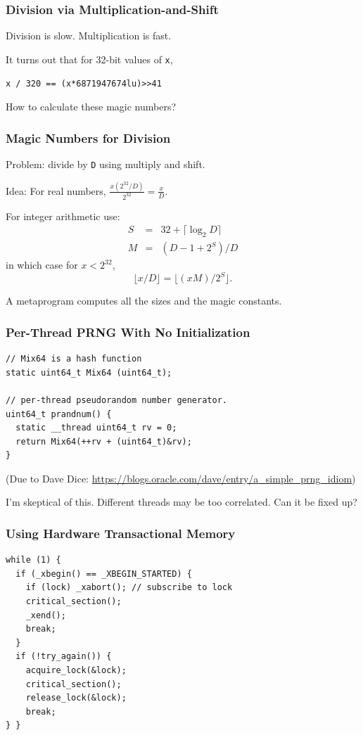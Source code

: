 \documentclass[xcolor=dvipsnames,14pt]{beamer}
\begin{document}
\begin{frame}
\frametitle{Division via Multiplication-and-Shift}

Division is slow.  Multiplication is fast.

It turns out that for 32-bit values of \texttt{x},
\begin{center}
\texttt{x / 320 == (x*6871947674lu)>>41}
\end{center}

How to calculate these magic numbers? 
\end{frame}

\begin{frame}
\frametitle{Magic Numbers for Division}

Problem: divide by \texttt{D} using multiply and shift.

Idea:  For real numbers, $\frac{x (2^{32}/D)}{2^{32}} = \frac{x}{D}$.

For integer arithmetic use:
\begin{eqnarray*}
S & = & 32+\lceil \log_2 D \rceil \\
M & = & (D-1+2^S)/D 
\end{eqnarray*}
in which case for $x<2^{32}$,
\[
\lfloor x/D \rfloor = \lfloor (xM)/2^S \rfloor.
\]

A metaprogram computes all the sizes and the magic constants.
\end{frame}

\begin{frame}[fragile]
\frametitle{Per-Thread PRNG With No Initialization}

\begin{verbatim}
// Mix64 is a hash function
static uint64_t Mix64 (uint64_t);

// per-thread pseudorandom number generator.
uint64_t prandnum() {
  static __thread uint64_t rv = 0;
  return Mix64(++rv + (uint64_t)&rv);
}
\end{verbatim}

(Due to Dave Dice:
\url{https://blogs.oracle.com/dave/entry/a_simple_prng_idiom})

I'm skeptical of this.  Different threads may be too correlated.  Can
it be fixed up?

\end{frame}

\begin{frame}[fragile]
\frametitle{Using Hardware Transactional Memory}

\begin{verbatim}
while (1) {
  if (_xbegin() == _XBEGIN_STARTED) {
    if (lock) _xabort(); // subscribe to lock
    critical_section();
    _xend();
    break;
  }
  if (!try_again()) {
    acquire_lock(&lock);
    critical_section();
    release_lock(&lock);
    break;
} }
\end{verbatim}
\end{frame}
\end{document}
